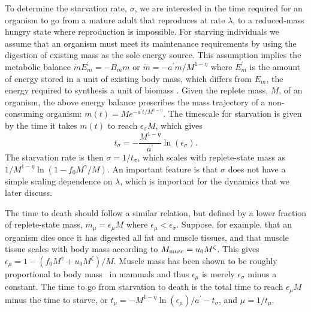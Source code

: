 \documentclass[twocolumn,preprintnumbers,amsmath,amssymb,superscriptaddress]{revtex4}
\begin{document}
\begin{bibunit}[unsrt]
{  To determine the starvation rate, $\sigma$, we are interested in the time
  required for an organism to go from a mature adult that reproduces at rate
  $\lambda$, to a reduced-mass hungry state where reproduction is impossible.
  For starving individuals we assume that an organism must meet its maintenance
  requirements by using the digestion of existing mass as the sole energy
  source.  This assumption implies the metabolic balance
  $\dot{m}E_{m}^{\prime}=-B_{m}m$ or $\dot{m}=-a^{\prime}m/M^{1-\eta}$
  where $E_{m}^{\prime}$ is the amount of energy stored in a unit of existing
  body mass, which differs from $E_{m}$, the energy required to
  synthesis a unit of biomass \citep{hou}. Given the replete mass, $M$, of an organism, the
  above energy balance prescribes the mass trajectory of a non-consuming
  organism: $m\left(t\right)=Me^{-a^{\prime}t/M^{1-\eta}}$.
  The timescale for starvation is
  given by the time it takes $m(t)$ to reach $\epsilon_{\sigma} M$, which gives
  \begin{equation}
  \label{eq:sigma}
  t_{\sigma}=-\frac{M^{1-\eta}}{a^{\prime}}\ln\left(\epsilon_{\sigma}\right).
  \end{equation}
  The starvation rate is then $\sigma=1/t_{\sigma}$, which scales with
  replete-state mass as $1/M^{1-\eta}\ln\left(1-f_{0}M^{\gamma}/M\right)$.  An important
  feature is that $\sigma$ does not have a simple scaling dependence on
  $\lambda$, which is important for the dynamics that we
  later discuss.

  The time to death should follow a similar relation, but defined by a lower
  fraction of replete-state mass, $m_{\mu}=\epsilon_{\mu} M$ where $\epsilon_\mu < \epsilon_\sigma$.
  Suppose, for example, that an organism dies once it has digested all fat and
  muscle tissues, and that muscle tissue scales with body mass according to
  $M_{\rm musc}=u_{0}M^{\zeta}$.  This gives
  $\epsilon_{\mu}=1-\left(f_{0}M^{\gamma}+u_{0}M^{\zeta}\right)/M$. Muscle
  mass has been shown to be roughly proportional to body mass~\citep{Folland:2008ij} in
  mammals and thus $\epsilon_{\mu}$ is merely $\epsilon_{\sigma}$ minus a constant. The time to go from starvation to death is the total time to reach $\epsilon_{\mu}M$ minus the time to starve, or $t_{\mu}=-M^{1-\eta}\ln\left(\epsilon_{\mu}\right)/a^{\prime}-t_{\sigma}$,
  and $\mu=1/t_{\mu}$.
  }


\end{bibunit}
\end{document}
